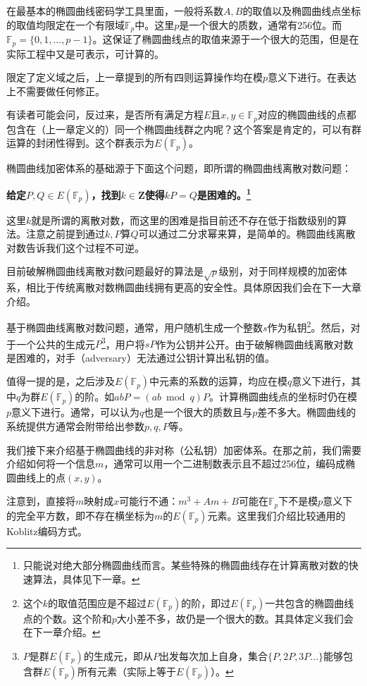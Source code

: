 \documentclass[12pt]{article}
\newcommand{\ec}{椭圆曲线}
\newcommand{\fp}{\mathbb{F}_p}
\begin{document}
在最基本的\ec 密码学工具里面，一般将系数$A,B$的取值以及\ec 点坐标的取值均限定在一个有限域$\mathbb{F}_p$中。这里$p$是一个很大的质数，通常有256位。而$\mathbb{F}_p=\{0,1,...,p-1\}$。这保证了\ec 点的取值来源于一个很大的范围，但是在实际工程中又是可表示，可计算的。

限定了定义域之后，上一章提到的所有四则运算操作均在模$p$意义下进行。在表达上不需要做任何修正。

有读者可能会问，反过来，是否所有满足方程$E$且$x,y \in \mathbb{F}_p$对应的椭圆曲线的点都包含在（上一章定义的）同一个\ec 群之内呢？这个答案是肯定的，可以有群运算的封闭性得到。这个群表示为$E(\fp)$。

\ec 加密体系的基础源于下面这个问题，即所谓的\ec 离散对数问题：

\textbf{给定$P,Q \in E(\mathbb{F}_p)$，找到$k \in \mathbf{Z}$使得$kP=Q$是困难的。\footnote{只能说对绝大部分\ec 而言。某些特殊的椭圆曲线存在计算离散对数的快速算法，具体见下一章。}}

这里$k$就是所谓的离散对数，而这里的困难是指目前还不存在低于指数级别的算法。注意之前提到通过$k,P$算$Q$可以通过二分求幂来算，是简单的。\ec 离散对数告诉我们这个过程不可逆。

目前破解\ec 离散对数问题最好的算法是$\sqrt{p}$级别，对于同样规模的加密体系，相比于传统离散对数\ec 拥有更高的安全性。具体原因我们会在下一大章介绍。

基于\ec 离散对数问题，通常，用户随机生成一个整数$s$作为私钥\footnote{这个$k$的取值范围应是不超过$E(\fp)$的阶，即过$E(\fp)$一共包含的\ec 点的个数。这个阶和$p$大小差不多，故仍是一个很大的数。其具体定义我们会在下一章介绍。}。然后，对于一个公共的生成元$P$\footnote{$P$是群$E(\fp)$的生成元，即从$P$出发每次加上自身，集合$\{P,2P,3P...\}$能够包含群$E(\fp)$所有元素（实际上等于$E(\fp)$）。}，用户将$sP$作为公钥并公开。由于破解\ec 离散对数是困难的，对手（adversary）无法通过公钥计算出私钥的值。

值得一提的是，之后涉及$E(\fp)$中元素的系数的运算，均应在模$q$意义下进行，其中$q$为群$E(\fp)$的阶。如$abP = (ab \bmod q)P$。计算椭圆曲线点的坐标时仍在模$p$意义下进行。通常，可以认为$q$也是一个很大的质数且与$p$差不多大。椭圆曲线的系统提供方通常会附带给出参数$p,q,P$等。

我们接下来介绍基于\ec 的非对称（公私钥）加密体系。在那之前，我们需要介绍如何将一个信息$m$，通常可以用一个二进制数表示且不超过256位，编码成椭圆曲线上的点$(x,y)$。

注意到，直接将$m$映射成$x$可能行不通：$m^3+Am+B$可能在$\fp$下不是模$p$意义下的完全平方数，即不存在横坐标为$m$的$E(\fp)$元素。这里我们介绍比较通用的Koblitz编码方式。
\end{document}
